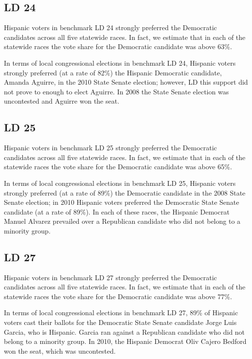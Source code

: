 \documentclass[12pt]{article}
\begin{document}
\subsection{LD 24}

Hispanic voters in benchmark LD 24 strongly preferred the Democratic candidates across all five statewide races. In fact, we estimate that in each of the statewide races the vote share for the Democratic candidate was above 63\%. 

In terms of local congressional elections in benchmark LD 24, Hispanic voters strongly preferred (at a rate of 82\%) the Hispanic Democratic candidate, Amanda Aguirre, in the 2010 State Senate election; however, LD this support did not prove to enough to elect Aguirre. In 2008 the State Senate election was uncontested and Aguirre won the seat.

\subsection{LD 25}

Hispanic voters in benchmark LD 25 strongly preferred the Democratic candidates across all five statewide races. In fact, we estimate that in each of the statewide races the vote share for the Democratic candidate was above 65\%. 

In terms of local congressional elections in benchmark LD 25, Hispanic voters strongly preferred (at a rate of 89\%) the Democratic candidate in the 2008 State Senate election; in 2010 Hispanic voters preferred the Democratic State Senate candidate (at a rate of 89\%). In each of these races, the Hispanic Democrat Manuel Alvarez prevailed over a Republican candidate who did not belong to a minority group.

\subsection{LD 27}

Hispanic voters in benchmark LD 27 strongly preferred the Democratic candidates across all five statewide races. In fact, we estimate that in each of the statewide races the vote share for the Democratic candidate was above 77\%. 

In terms of local congressional elections in benchmark LD 27, 89\% of Hispanic voters cast their ballots for the Democratic State Senate candidate Jorge Luis Garcia, who is Hispanic. Garcia ran against a Republican candidate who did not belong to a minority group. In 2010, the Hispanic Democrat Oliv Cajero Bedford won the seat, which was uncontested. 
\end{document}
